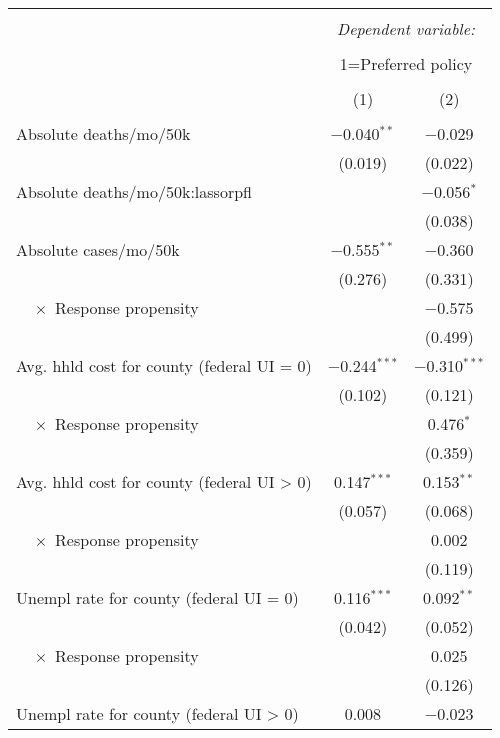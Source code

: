 
\begin{table}[!htbp] \centering 
  \caption{} 
  \label{} 
\begin{tabular}{@{\extracolsep{5pt}}lcc} 
\\[-1.8ex]\hline 
\hline \\[-1.8ex] 
 & \multicolumn{2}{c}{\textit{Dependent variable:}} \\ 
\cline{2-3} 
\\[-1.8ex] & \multicolumn{2}{c}{1=Preferred policy} \\ 
\\[-1.8ex] & (1) & (2)\\ 
\hline \\[-1.8ex] 
 Absolute deaths/mo/50k & $-$0.040$^{**}$ & $-$0.029 \\ 
  & (0.019) & (0.022) \\ 
  Absolute deaths/mo/50k:lassorpfl &  & $-$0.056$^{*}$ \\ 
  &  & (0.038) \\ 
  Absolute cases/mo/50k & $-$0.555$^{**}$ & $-$0.360 \\ 
  & (0.276) & (0.331) \\ 
  $\quad \times$ Response propensity &  & $-$0.575 \\ 
  &  & (0.499) \\ 
  Avg. hhld cost for county (federal UI = 0) & $-$0.244$^{***}$ & $-$0.310$^{***}$ \\ 
  & (0.102) & (0.121) \\ 
  $\quad \times$ Response propensity &  & 0.476$^{*}$ \\ 
  &  & (0.359) \\ 
  Avg. hhld cost for county (federal UI > 0) & 0.147$^{***}$ & 0.153$^{**}$ \\ 
  & (0.057) & (0.068) \\ 
  $\quad \times$ Response propensity &  & 0.002 \\ 
  &  & (0.119) \\ 
  Unempl rate for county (federal UI = 0) & 0.116$^{***}$ & 0.092$^{**}$ \\ 
  & (0.042) & (0.052) \\ 
  $\quad \times$ Response propensity &  & 0.025 \\ 
  &  & (0.126) \\ 
  Unempl rate for county (federal UI > 0) & 0.008 & $-$0.023 \\ 

\end{tabular}
\end{table}
